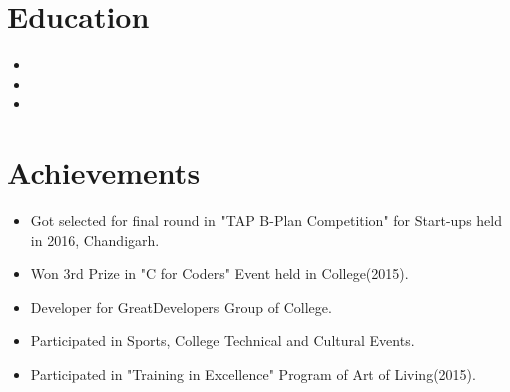 \documentclass[11pt,a4paper,sans]{moderncv}        %
\begin{document}
\section{Education}

\vspace{6pt}

\begin{itemize}

\item{}

\item{}  %

\item{}

\end{itemize}

\section{Achievements}

\vspace{6pt}

\begin{itemize}

\item Got selected for final round in "TAP B-Plan Competition" for Start-ups held in 2016, Chandigarh.

\vspace{6pt}

\item Won 3rd Prize in "C for Coders" Event held in College(2015).

\vspace{6pt}

\item Developer for GreatDevelopers Group of College.

\vspace{6pt}

\item Participated in Sports, College Technical and Cultural Events.

\vspace{6pt}

\item Participated in "Training in Excellence" Program of Art of Living(2015).


\end{itemize}
\end{document}
